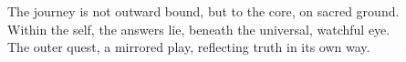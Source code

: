 \documentclass{article}
\begin{document}
\begin{infobox}
The journey is not outward bound, but to the core, on sacred ground.\\
Within the self, the answers lie, beneath the universal, watchful eye.\\
The outer quest, a mirrored play, reflecting truth in its own way.
\end{infobox}
\end{document}
